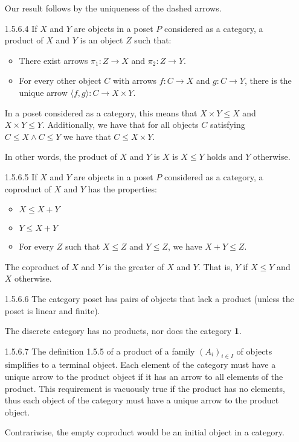 \documentclass{article}
\begin{document}
\begin{enumerate}
  Our result follows by the uniqueness of the dashed arrows.

\item[]
\item [1.5.6.4]
  If $X$ and $Y$ are objects in a poset $P$ considered as a category, a product of $X$ and $Y$ is an object $Z$ such that:
  \begin{itemize}
  \item There exist arrows $\pi_1 : Z \rightarrow X$ and $\pi_2 : Z \rightarrow Y$.
  \item For every other object $C$ with arrows $f : C \rightarrow X$ and $g : C \rightarrow Y$, there is the unique arrow $\langle f , g \rangle : C \rightarrow X \times Y$.
  \end{itemize}
  In a poset considered as a category, this means that $X \times Y \le X$ and $X \times Y \le Y$.
  Additionally, we have that for all objects $C$ satisfying $C \le X \wedge C \le Y$ we have that $C \le X \times Y$.

  In other words, the product of $X$ and $Y$ is $X$ is $X \le Y$ holds and $Y$ otherwise.

\item[]
\item [1.5.6.5]
  If $X$ and $Y$ are objects in a poset $P$ considered as a category, a coproduct of $X$ and $Y$ has the properties:
  \begin{itemize}
  \item $X \le X + Y$
  \item $Y \le X + Y$
  \item For every $Z$ such that $X \le Z$ and $Y \le Z$, we have $X + Y \le Z$.
  \end{itemize}

  The coproduct of $X$ and $Y$ is the greater of $X$ and $Y$.
  That is, $Y$ if $X \le Y$ and $X$ otherwise.

\item[]
\item [1.5.6.6]
  The category poset has pairs of objects that lack a product (unless the poset is linear and finite).

  The discrete category has no products, nor does the category \textbf{1}.

\item[]
\item [1.5.6.7]
  The definition 1.5.5 of a product of a family $(A_i)_{i\in I}$ of objects simplifies to a terminal object.
  Each element of the category must have a unique arrow to the product object if it has an arrow to all elements of the product.
  This requirement is vacuously true if the product has no elements, thus each object of the category must have a unique arrow to the product object.

  Contrariwise, the empty coproduct would be an initial object in a category.
  
\end{enumerate}
\end{document}
